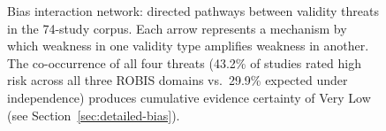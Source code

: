 \begin{figure}[!h]
{%
}%
\caption{Bias interaction network: directed pathways between validity threats in the 74-study corpus. Each arrow represents a mechanism by which weakness in one validity type amplifies weakness in another. The co-occurrence of all four threats (43.2\% of studies rated high risk across all three ROBIS domains vs.\ 29.9\% expected under independence) produces cumulative evidence certainty of Very Low (see Section~\ref{sec:detailed-bias}).}
\label{fig:bias-interaction-network}
\end{figure}
